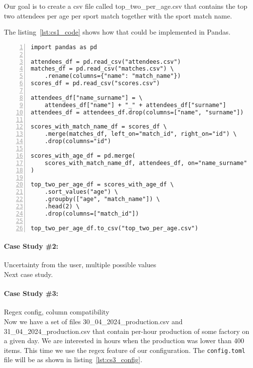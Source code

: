 Our goal is to create a csv file called top\_two\_per\_age.csv that contains the top two attendees per age per sport match
together with the sport match name.

The listing~\ref{lst:cs1_code} shows how that could be implemented in Pandas.

\begin{lstlisting}[caption=Solution of the first case study in Pandas, label={lst:cs1_code}, captionpos=b, numbers=left]
import pandas as pd

attendees_df = pd.read_csv("attendees.csv")
matches_df = pd.read_csv("matches.csv") \
    .rename(columns={"name": "match_name"})
scores_df = pd.read_csv("scores.csv")

attendees_df["name_surname"] = \
    attendees_df["name"] + "_" + attendees_df["surname"]
attendees_df = attendees_df.drop(columns=["name", "surname"])

scores_with_match_name_df = scores_df \
    .merge(matches_df, left_on="match_id", right_on="id") \
    .drop(columns="id")

scores_with_age_df = pd.merge(
    scores_with_match_name_df, attendees_df, on="name_surname"
)

top_two_per_age_df = scores_with_age_df \
    .sort_values("age") \
    .groupby(["age", "match_name"]) \
    .head(2) \
    .drop(columns=["match_id"])

top_two_per_age_df.to_csv("top_two_per_age.csv")
\end{lstlisting}



\paragraph{Case Study \#2:} Uncertainty from the user, multiple possible values \\

Next case study.


\paragraph{Case Study \#3:} Regex config, column compatibility \\

Now we have a set of files 30\_04\_2024\_production.csv and 31\_04\_2024\_production.csv that contain per-hour production
of some factory on a given day.
We are interested in hours when the production was lower than 400 items.
This time we use the regex feature of our configuration.
The \verb|config.toml| file will be as shown in listing~\ref{lst:cs3_config}.

